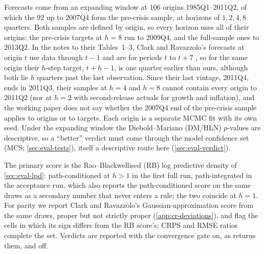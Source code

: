 Forecasts come from an expanding window at $106$ origins 1985Q1--2011Q2, of which the $92$ up
to 2007Q4 form the pre-crisis sample, at horizons of $1, 2, 4, 8$ quarters. Both samples are
defined by origin, so every horizon uses all of their origins: the pre-crisis targets at $h = 8$
run to 2009Q4, and the full-sample ones to 2013Q2. %
In the notes to their Tables~1--3, Clark and Ravazzolo's forecasts at origin $t$ use data through
$t-1$ and are for periods $t$ to $t+7$ \citep{clark2012macroeconomic}, so for the same origin their
$h$-step target, $t+h-1$, is one quarter earlier than ours, although both lie $h$ quarters past the
last observation. Since their last vintage, 2011Q4, ends in 2011Q3, their samples at $h = 4$ and
$h = 8$ cannot contain every origin to 2011Q2 (nor at $h = 2$ with second-release actuals for growth
and inflation), and the working paper does not say whether the 2007Q4 end of the pre-crisis sample
applies to origins or to targets.
Each origin is a separate MCMC fit with its own seed.
Under the expanding window the Diebold--Mariano (DM/HLN) $p$-values are descriptive, so a
``better'' verdict must come through the model confidence set (MCS; \cref{sec:eval-tests}), itself a
descriptive route here (\cref{sec:eval-verdict}).

The primary score is the Rao--Blackwellised (RB) log predictive density of
\cref{sec:eval-lpd}: path-conditioned at $h > 1$ in the first full run, path-integrated in the
acceptance run, which also reports the path-conditioned score on the same draws as a secondary
number that never enters a rule; the two coincide at $h = 1$.
For parity we report Clark and Ravazzolo's Gaussian-approximation score
\citep{adolfson2007forecasting} from the same draws, proper but not strictly proper
(\cref{app:cr-deviations}), and flag the cells in which its sign differs from the RB score's; CRPS
and RMSE ratios complete the set. Verdicts are reported with the convergence gate on, as
 returns them, and off.

